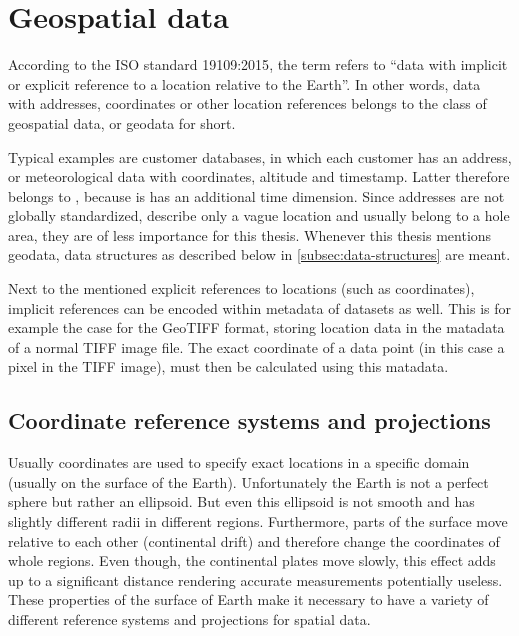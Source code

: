 
\section{Geospatial data}

	According to the ISO standard 19109:2015\cite{geolexica-202}, the term  refers to \enquote{data with implicit or explicit reference to a location relative to the Earth}.
	In other words, data with addresses, coordinates or other location references belongs to the class of geospatial data, or geodata for short.
	
	Typical examples are customer databases, in which each customer has an address, or meteorological data with coordinates, altitude and timestamp.
	Latter therefore belongs to , because is has an additional time dimension.
	Since addresses are not globally standardized, describe only a vague location and usually belong to a hole area, they are of less importance for this thesis.
	Whenever this thesis mentions geodata, data structures as described below in \cref{subsec:data-structures} are meant.
	
	Next to the mentioned explicit references to locations (such as coordinates), implicit references can be encoded within metadata of datasets as well.
	This is for example the case for the GeoTIFF format, storing location data in the matadata of a normal TIFF image file\cite{ogc-geotiff}.
	The exact coordinate of a data point (in this case a pixel in the TIFF image), must then be calculated using this matadata.

	\subsection{Coordinate reference systems and projections}
	
		Usually coordinates are used to specify exact locations in a specific domain (usually on the surface of the Earth).
		Unfortunately the Earth is not a perfect sphere but rather an ellipsoid.
		But even this ellipsoid is not smooth and has slightly different radii in different regions.
		Furthermore, parts of the surface move relative to each other (continental drift) and therefore change the coordinates of whole regions.
		Even though, the continental plates move slowly, this effect adds up to a significant distance rendering accurate measurements potentially useless\cite[7]{ordenance-survey-booklet}.
		These properties of the surface of Earth make it necessary to have a variety of different reference systems and projections for spatial data.
		
